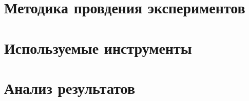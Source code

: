 \section{Методика провдения экспериментов}

\clearpage

\section{Используемые инструменты}

\clearpage

\section{Анализ результатов}

\clearpage
